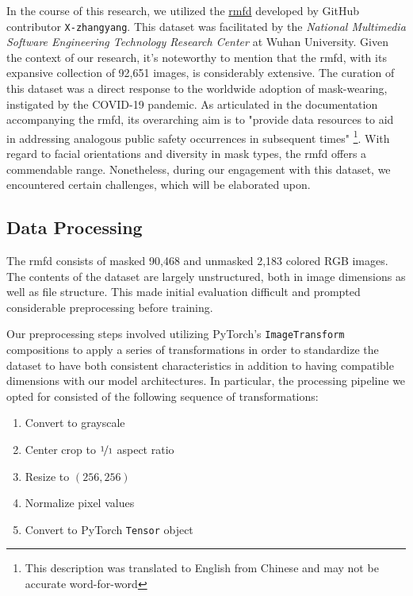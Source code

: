 \documentclass{article}
\begin{document}
In the course of this research, we utilized the \href{https://github.com/X-zhangyang/Real-World-Masked-Face-Dataset}{\gls{rmfd}} developed by GitHub contributor \texttt{X-zhangyang}. This dataset was facilitated by the \textit{National Multimedia Software Engineering Technology Research Center} at Wuhan University. Given the context of our research, it's noteworthy to mention that the \gls{rmfd}, with its expansive collection of 92,651 images, is considerably extensive. The curation of this dataset was a direct response to the worldwide adoption of mask-wearing, instigated by the COVID-19 pandemic. As articulated in the documentation accompanying the \gls{rmfd}, its overarching aim is to "provide data resources to aid in addressing analogous public safety occurrences in subsequent times" \footnote{This description was translated to English from Chinese and may not be accurate word-for-word}. With regard to facial orientations and diversity in mask types, the \gls{rmfd} offers a commendable range. Nonetheless, during our engagement with this dataset, we encountered certain challenges, which will be elaborated upon.

\subsection{Data Processing}

The \gls{rmfd} consists of masked 90,468 and unmasked 2,183 colored RGB images. The contents of the dataset are largely unstructured, both in image dimensions as well as file structure. This made initial evaluation difficult and prompted considerable preprocessing before training. 

Our preprocessing steps involved utilizing PyTorch's \texttt{ImageTransform} compositions to apply a series of transformations in order to standardize the dataset to have both consistent characteristics in addition to having compatible dimensions with our model architectures. In particular, the processing pipeline we opted for consisted of the following sequence of transformations:

\begin{enumerate}
    \item Convert to grayscale
    \item Center crop to $\nicefrac{1}{1}$ aspect ratio
    \item Resize to $(256, 256)$
    \item Normalize pixel values
    \item Convert to PyTorch \texttt{Tensor} object
\end{enumerate}
\end{document}

